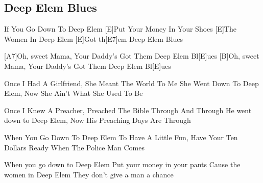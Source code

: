 \subsection*{Deep Elem Blues   }
\begin{guitar}
[E]If You Go Down To Deep Elem 
[E]Put Your Money In Your Shoes 
[E]The Women In Deep Elem 
[E]Got th[E7]em Deep Elem Blues 
 


[A7]Oh, sweet Mama, 
Your Daddy's Got Them Deep Elem Bl[E]ues 
[B]Oh, sweet Mama, 
Your Daddy's Got Them Deep Elem Bl[E]ues 
 


Once I Had A Girlfriend, 
She Meant The World To Me 
She Went Down To Deep Elem, 
Now She Ain't What She Used To Be 
 


Once I Knew A Preacher, 
Preached The Bible Through And Through 
He went down to Deep Elem, 
Now His Preaching Days Are Through 
 


When You Go Down To Deep Elem 
To Have A Little Fun, 
Have Your Ten Dollars Ready 
When The Police Man Comes 
 


When you go down to Deep Elem 
Put your money in your pants 
Cause the women in Deep Elem 
They don't give a man a chance 
\end{guitar}
